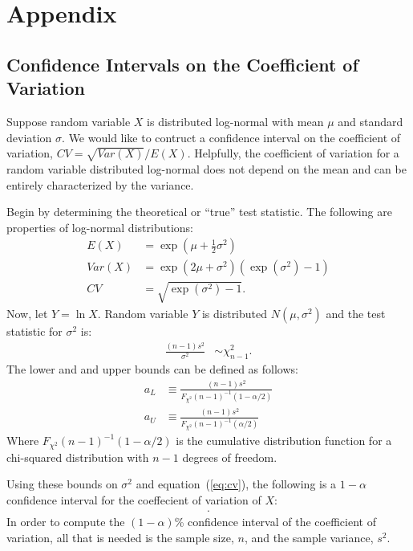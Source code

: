 \documentclass[notitlepage]{article}
\begin{document}
\nocite{*}



\newpage

\appendix
\section{Appendix}
\subsection{Confidence Intervals on the Coefficient of Variation}
\label{app:cov}

Suppose random variable $X$ is distributed log-normal with mean $\mu$ and standard deviation $\sigma$. We would like to contruct a confidence interval on the coefficient of variation, $CV=\sqrt{Var(X)}/E(X)$. Helpfully, the coefficient of variation for a random variable distributed log-normal does not depend on the mean and can be entirely characterized by the variance.

Begin by determining the theoretical or ``true'' test statistic. The following are properties of log-normal distributions:
\begin{align}
E(X) & =  \exp(\mu+\frac{1}{2} \sigma^{2}) \\
Var(X) & =  \exp(2\mu + \sigma^{2})(\exp(\sigma^{2})-1) \\
\label{eq:cv} CV & = \sqrt{\exp(\sigma^{2})-1}.
\end{align}
Now, let $Y=\ln X$. Random variable $Y$ is distributed $N(\mu,\sigma^{2})$ and the test statistic for $\sigma^{2}$ is:
\begin{align*}
\frac{(n-1)s^{2}}{\sigma^{2}} & \sim \chi^{2}_{n-1}.
\end{align*}
The lower and and upper bounds can be defined as follows:
\begin{align*}
a_{L}&\equiv\frac{(n-1)s^{2}}{F_{\chi^{2}}(n-1)^{-1}(1-\alpha/2)}\\
a_{U}&\equiv\frac{(n-1)s^{2}}{F_{\chi^{2}}(n-1)^{-1}(\alpha/2)}
\end{align*}
Where $F_{\chi^{2}}(n-1)^{-1}(1-\alpha/2)$ is the cumulative distribution function for a chi-squared distribution with $n-1$ degrees of freedom. 

Using these bounds on $\sigma^{2}$ and equation~(\ref{eq:cv}), the following is a $1-\alpha$ confidence interval for the coeffecient of variation of $X$:
\begin{align}
[ \sqrt{\exp(a_{L})-1},\sqrt{\exp(a_{U})-1} ].
\end{align}
In order to compute the $(1-\alpha)$\% confidence interval of the coefficient of variation, all that is needed is the sample size, $n$, and the sample variance, $s^{2}$.
\end{document}

